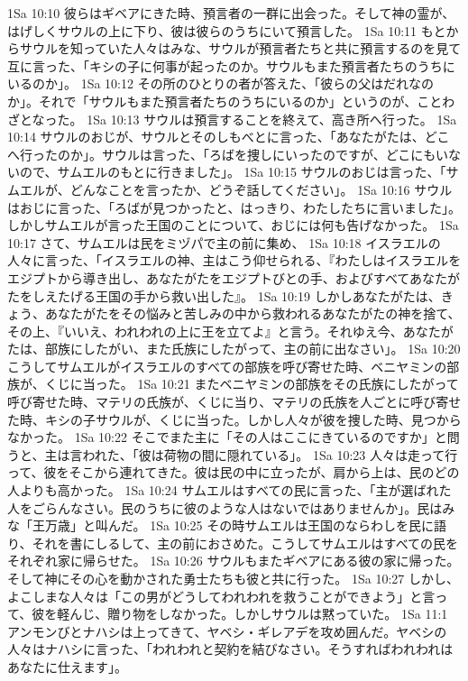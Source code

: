 1Sa 10:10  彼らはギベアにきた時、預言者の一群に出会った。そして神の霊が、はげしくサウルの上に下り、彼は彼らのうちにいて預言した。
1Sa 10:11  もとからサウルを知っていた人々はみな、サウルが預言者たちと共に預言するのを見て互に言った、「キシの子に何事が起ったのか。サウルもまた預言者たちのうちにいるのか」。
1Sa 10:12  その所のひとりの者が答えた、「彼らの父はだれなのか」。それで「サウルもまた預言者たちのうちにいるのか」というのが、ことわざとなった。
1Sa 10:13  サウルは預言することを終えて、高き所へ行った。
1Sa 10:14  サウルのおじが、サウルとそのしもべとに言った、「あなたがたは、どこへ行ったのか」。サウルは言った、「ろばを捜しにいったのですが、どこにもいないので、サムエルのもとに行きました」。
1Sa 10:15  サウルのおじは言った、「サムエルが、どんなことを言ったか、どうぞ話してください」。
1Sa 10:16  サウルはおじに言った、「ろばが見つかったと、はっきり、わたしたちに言いました」。しかしサムエルが言った王国のことについて、おじには何も告げなかった。
1Sa 10:17  さて、サムエルは民をミヅパで主の前に集め、
1Sa 10:18  イスラエルの人々に言った、「イスラエルの神、主はこう仰せられる、『わたしはイスラエルをエジプトから導き出し、あなたがたをエジプトびとの手、およびすべてあなたがたをしえたげる王国の手から救い出した』。
1Sa 10:19  しかしあなたがたは、きょう、あなたがたをその悩みと苦しみの中から救われるあなたがたの神を捨て、その上、『いいえ、われわれの上に王を立てよ』と言う。それゆえ今、あなたがたは、部族にしたがい、また氏族にしたがって、主の前に出なさい」。
1Sa 10:20  こうしてサムエルがイスラエルのすべての部族を呼び寄せた時、ベニヤミンの部族が、くじに当った。
1Sa 10:21  またベニヤミンの部族をその氏族にしたがって呼び寄せた時、マテリの氏族が、くじに当り、マテリの氏族を人ごとに呼び寄せた時、キシの子サウルが、くじに当った。しかし人々が彼を捜した時、見つからなかった。
1Sa 10:22  そこでまた主に「その人はここにきているのですか」と問うと、主は言われた、「彼は荷物の間に隠れている」。
1Sa 10:23  人々は走って行って、彼をそこから連れてきた。彼は民の中に立ったが、肩から上は、民のどの人よりも高かった。
1Sa 10:24  サムエルはすべての民に言った、「主が選ばれた人をごらんなさい。民のうちに彼のような人はないではありませんか」。民はみな「王万歳」と叫んだ。
1Sa 10:25  その時サムエルは王国のならわしを民に語り、それを書にしるして、主の前におさめた。こうしてサムエルはすべての民をそれぞれ家に帰らせた。
1Sa 10:26  サウルもまたギベアにある彼の家に帰った。そして神にその心を動かされた勇士たちも彼と共に行った。
1Sa 10:27  しかし、よこしまな人々は「この男がどうしてわれわれを救うことができよう」と言って、彼を軽んじ、贈り物をしなかった。しかしサウルは黙っていた。
1Sa 11:1  アンモンびとナハシは上ってきて、ヤベシ・ギレアデを攻め囲んだ。ヤベシの人々はナハシに言った、「われわれと契約を結びなさい。そうすればわれわれはあなたに仕えます」。
